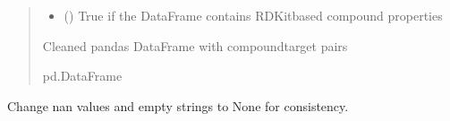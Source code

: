 \documentclass[letterpaper,10pt,english]{sphinxmanual}
\begin{document}
\begin{fulllineitems}
\begin{quote}
\begin{description}
\begin{itemize}
\item {} 
\sphinxAtStartPar
{} () \textendash{} True if the DataFrame contains RDKit\sphinxhyphen{}based compound properties

\end{itemize}

\sphinxAtStartPar
Cleaned pandas DataFrame with compound\sphinxhyphen{}target pairs

\sphinxAtStartPar
pd.DataFrame

\end{description}\end{quote}

\end{fulllineitems}


\begin{fulllineitems}
\label{\detokenize{clean_dataset:clean_dataset.clean_none_values}}
\pysigstartsignatures
{}
\pysigstopsignatures
\sphinxAtStartPar
Change nan values and empty strings to None for consistency.

\end{fulllineitems}

\end{document}
